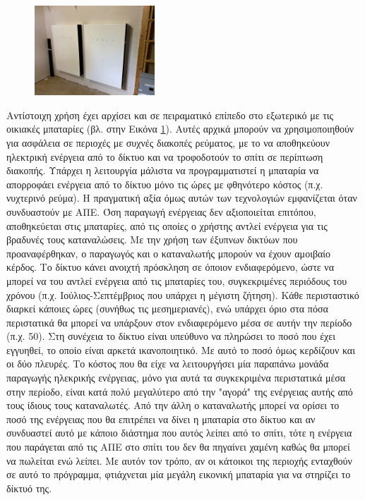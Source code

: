 \documentclass[12pt]{report}
\begin{document}
\begin{figure}
\includegraphics[width=0.4\textwidth]{powerwall}
\captionsetup{name=Εικόνα}
\caption{{}}
\label{fig:powerwall}
\end{figure}
Αντίστοιχη χρήση έχει αρχίσει και σε πειραματικό επίπεδο στο εξωτερικό με τις οικιακές μπαταρίες (βλ. {} στην Εικόνα \ref{fig:powerwall}). 
Αυτές αρχικά μπορούν να χρησιμοποιηθούν για ασφάλεια σε περιοχές με συχνές διακοπές ρεύματος, με το να αποθηκεύουν
ηλεκτρική ενέργεια από το δίκτυο και να τροφοδοτούν το σπίτι σε περίπτωση διακοπής. Υπάρχει η λειτουργία μάλιστα να προγραμματιστεί η μπαταρία να απορροφάει ενέργεια από το δίκτυο μόνο τις ώρες με φθηνότερο κόστος (π.χ. νυχτερινό
ρεύμα). Η πραγματική αξία όμως αυτών των τεχνολογιών εμφανίζεται όταν συνδυαστούν με ΑΠΕ. Όση παραγωγή ενέργειας δεν αξιοποιείται επιτόπου, αποθηκεύεται στις μπαταρίες, από τις οποίες ο χρήστης αντλεί ενέργεια για τις βραδυνές
τους καταναλώσεις. Με την χρήση των έξυπνων δικτύων που προαναφέρθηκαν, ο παραγωγός και ο καταναλωτής μπορούν να έχουν αμοιβαίο κέρδος.
Το δίκτυο κάνει ανοιχτή πρόσκληση σε όποιον ενδιαφερόμενο, ώστε να μπορεί να του αντλεί ενέργεια από τις μπαταρίες του, συγκεκριμένες περιόδους του χρόνου (π.χ. Ιούλιος-Σεπτέμβριος που υπάρχει η μέγιστη ζήτηση). Κάθε περισταστικό
διαρκεί κάποιες ώρες (συνήθως τις μεσημεριανές), ενώ υπάρχει όριο στα πόσα περιστατικά θα μπορεί να υπάρξουν στον ενδιαφερόμενο μέσα σε αυτήν την περίοδο (π.χ. 50). Στη συνέχεια το δίκτυο είναι υπεύθυνο να πληρώσει το ποσό 
που έχει εγγυηθεί, το οποίο είναι αρκετά ικανοποιητικό. Με αυτό το ποσό όμως κερδίζουν και οι δύο πλευρές. Το κόστος που θα είχε να λειτουργήσει μία παραπάνω μονάδα παραγωγής ηλεκρικής ενέργειας, 
μόνο για αυτά τα συγκεκριμένα περιστατικά μέσα στην περίοδο, είναι κατά πολύ μεγαλύτερο από την "αγορά" της ενέργειας αυτής από τους ίδιους τους καταναλωτές. Από την άλλη ο καταναλωτής μπορεί να ορίσει το ποσό της ενέργειας
που θα επιτρέπει να δίνει η μπαταρία στο δίκτυο και αν συνδυαστεί αυτό με κάποιο διάστημα που αυτός λείπει από το σπίτι, τότε η ενέργεια που παράγεται από τις ΑΠΕ στο σπίτι του δεν θα πηγαίνει χαμένη καθώς
θα μπορεί να πωλείται ενώ λείπει. Με αυτόν τον τρόπο, αν οι κάτοικοι της περιοχής ενταχθούν σε αυτό το πρόγραμμα, φτιάχνεται μία μεγάλη εικονική μπαταρία για να στηρίζει το δίκτυό της.
\end{document}

